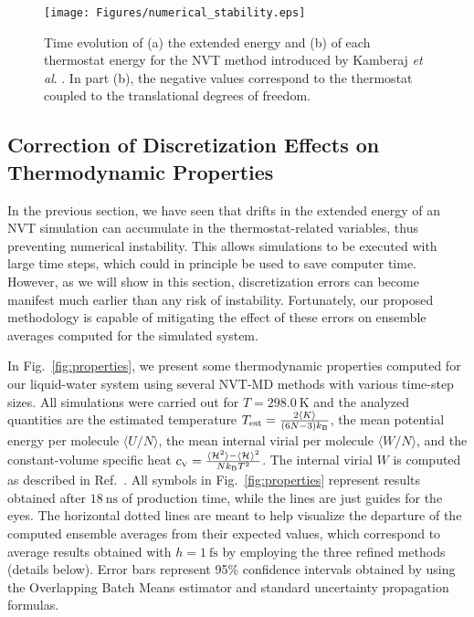\documentclass[
	aip,
	jcp,
	reprint,
]{revtex4-1}
\newcommand{\Ham}[1]{{\mathcal H}_\text{#1}}           %
\newcommand{\timestep}{h}
\newcommand{\mini}[1]{\text{\tiny{#1}}}
\begin{document}
\begin{figure}
	\texttt{[image: Figures/numerical\_stability.eps]}
	\caption{Time evolution of (a) the extended energy and (b) of each thermostat energy for the NVT method introduced by Kamberaj \textit{et al}. \cite{Kamberaj_2005}. In part (b), the negative values correspond to the thermostat coupled to the translational degrees of freedom.}
	\label{fig:num_stab}
\end{figure}

\subsection{Correction of Discretization Effects on Thermodynamic Properties}

In the previous section, we have seen that drifts in the extended energy of an NVT simulation can accumulate in the thermostat-related variables, thus preventing numerical instability.
This allows simulations to be executed with large time steps, which could in principle be used to save computer time.
However, as we will show in this section, discretization errors can become manifest much earlier than any risk of instability.
Fortunately, our proposed methodology is capable of mitigating the effect of these errors on ensemble averages computed for the simulated system.

In Fig.~\ref{fig:properties}, we present some thermodynamic properties computed for our liquid-water system using several NVT-MD methods with various time-step sizes.
All simulations were carried out for $T = 298.0~\text{K}$ and the analyzed quantities are the estimated temperature $T_\text{est} = \frac{2\langle K \rangle}{(6N-3)k_\mini{B}}$,
the mean potential energy per molecule $\langle U/N \rangle$,
the mean internal virial per molecule $\langle W/N \rangle$, and
the constant-volume specific heat $c_\mini{V} = \frac{\langle \Ham{}^2 \rangle - \langle \Ham{} \rangle^2}{N k_\mini{B} T^2}$.
The internal virial $W$ is computed as described in Ref.~.
All symbols in Fig.~\ref{fig:properties} represent results obtained after $18~\text{ns}$ of production time, while the lines are just guides for the eyes.
The horizontal dotted lines are meant to help visualize the departure of the computed ensemble averages from their expected values, which correspond to average results obtained with $\timestep = 1~\text{fs}$ by employing the three refined methods (details below).
Error bars represent 95\% confidence intervals obtained by using the Overlapping Batch Means estimator \cite{Meketon_1984, Flegal_2010} and standard uncertainty propagation formulas.
\end{document}
